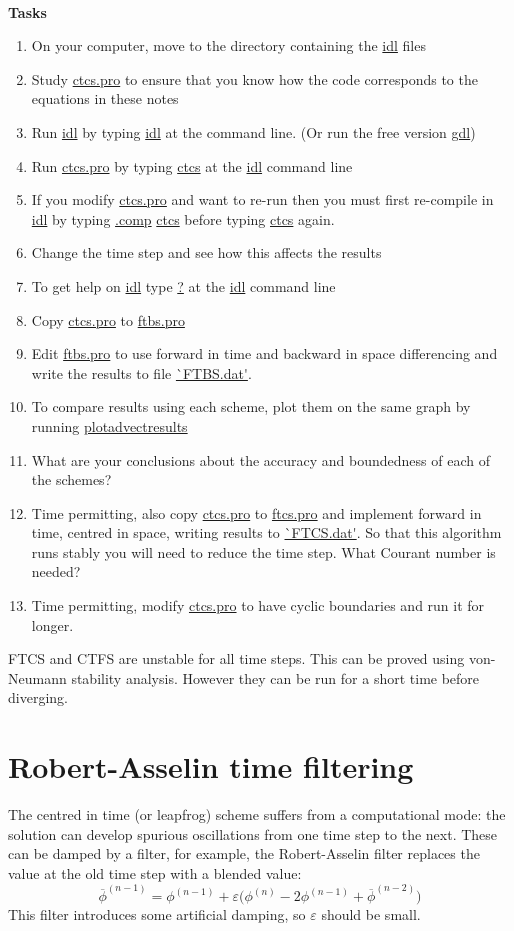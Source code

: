 {\ \\ \bf Tasks}
\begin{enumerate}
\item On your computer, move to the directory containing the \url{idl} files
\item Study \url{ctcs.pro} to ensure that you know how the code corresponds to the equations in these notes
\item Run \url{idl} by typing \url{idl} at the command line. (Or run the free version \url{gdl})
\item Run \url{ctcs.pro} by typing \url{ctcs} at the \url{idl} command line
\item If you modify \url{ctcs.pro} and want to re-run then you must first re-compile in \url{idl} by typing \url{.comp} \url{ctcs} before typing \url{ctcs} again.
\item Change the time step and see how this affects the results
\item To get help on \url{idl} type \url{?} at the \url{idl} command line
\item Copy \url{ctcs.pro} to \url{ftbs.pro}
\item Edit \url{ftbs.pro} to use forward in time and backward in space differencing and write the results to file \url{`FTBS.dat'}.
\item To compare results using each scheme, plot them on the same graph by running \url{plotadvectresults}
\item What are your conclusions about the accuracy and boundedness of each of the schemes?
\item Time permitting, also copy \url{ctcs.pro} to \url{ftcs.pro} and implement forward in time, centred in space, writing results to  \url{`FTCS.dat'}. So that this algorithm runs stably you will need to reduce the time step. What Courant number is needed?
\item Time permitting, modify \url{ctcs.pro} to have cyclic boundaries and run it for longer.
\end{enumerate}

FTCS and CTFS are unstable for all time steps. This can be proved using von-Neumann stability analysis. However they can be run for a short time before diverging.

\section{Robert-Asselin time filtering}

The centred in time (or leapfrog) scheme suffers from a computational mode: the solution can develop spurious oscillations from one time step to the next. These can be damped by a filter, for example, the Robert-Asselin filter replaces the value at the old time step with a blended value:
\begin{equation}
\overline{\phi}^{(n-1)} = \phi^{(n-1)} + \varepsilon \bigl(\phi^{(n)} - 2\phi^{(n-1)} + \overline{\phi}^{(n-2)}\bigr)
\end{equation}
This filter introduces some artificial damping, so $\varepsilon$ should be small. 

